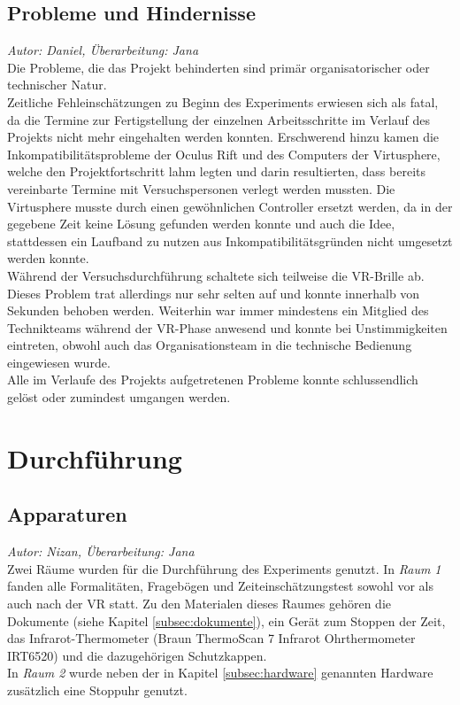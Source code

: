 \documentclass{Bericht}
\begin{document}
\subsection{Probleme und Hindernisse}
\textit{Autor: Daniel, Überarbeitung: Jana}\\
Die Probleme, die das Projekt behinderten sind primär organisatorischer oder technischer Natur.\\
Zeitliche Fehleinschätzungen zu Beginn des Experiments erwiesen sich als fatal, da die Termine zur Fertigstellung der einzelnen Arbeitsschritte im Verlauf des Projekts nicht mehr eingehalten werden konnten.
Erschwerend hinzu kamen die Inkompatibilitätsprobleme der Oculus Rift und des Computers der Virtusphere, welche den Projektfortschritt lahm legten und darin resultierten, dass bereits vereinbarte Termine mit Versuchspersonen verlegt werden mussten. Die Virtusphere musste durch einen gewöhnlichen Controller ersetzt werden, da in der gegebene Zeit keine Lösung gefunden werden konnte und auch die Idee, stattdessen ein Laufband zu nutzen aus Inkompatibilitätsgründen nicht umgesetzt werden konnte.\\
	Während der Versuchsdurchführung schaltete sich teilweise die VR-Brille ab. Dieses Problem trat allerdings nur sehr selten auf und konnte innerhalb von Sekunden behoben werden. Weiterhin war immer mindestens ein Mitglied des Technikteams während der VR-Phase anwesend und konnte bei Unstimmigkeiten eintreten, obwohl auch das Organisationsteam in die technische Bedienung eingewiesen wurde.\\
	Alle im Verlaufe des Projekts aufgetretenen Probleme konnte schlussendlich gelöst oder zumindest umgangen werden.
	\label{sec:hindernisse}

\section{Durchführung}
\subsection{Apparaturen}
\textit{Autor: Nizan, Überarbeitung: Jana}\\
Zwei Räume wurden für die Durchführung des Experiments genutzt. In  \textit{Raum 1} fanden alle Formalitäten, Fragebögen und Zeiteinschätzungstest sowohl vor als auch nach der VR statt. Zu den Materialen dieses Raumes gehören die Dokumente (siehe Kapitel \ref{subsec:dokumente}), ein Gerät zum Stoppen der Zeit, das Infrarot-Thermometer (Braun ThermoScan 7 Infrarot Ohrthermometer IRT6520) und die dazugehörigen Schutzkappen. \\
In \textit{Raum 2} wurde neben der in Kapitel \ref{subsec:hardware} genannten Hardware zusätzlich eine Stoppuhr genutzt. 
\end{document}
